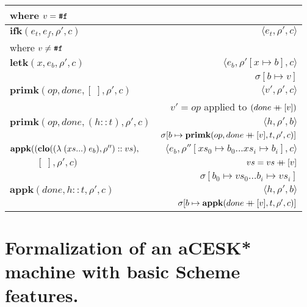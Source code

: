 \documentclass[12pt,draft]{article}
\newcommand\mdoubleplus{\ensuremath{\mathbin{+\mkern-9mu+}}}
\begin{document}
\begin{center}
\begin{tabular}{l | r}
where $v = \texttt{\#f}$ & \\
\hline
$ \textbf{ifk}(e_t , e_f , \rho' , c) $ 
& $\langle e_t , \rho' , c \rangle$ \\
where $v \not= \texttt{\#f}$ & \\
\hline
$ \textbf{letk}(x , e_b , \rho' , c) $ 
& $\langle e_b , \rho'[x \mapsto b] , c \rangle$ \\
& $ \sigma[b \mapsto v] $ \\
\hline
$ \textbf{primk}(op , done ,  [\;] , \rho' , c) $ 
& $\langle v' , \rho' , c \rangle$ \\
& $ v' = op $ applied to $(done \mdoubleplus [v])$ \\
\hline
$ \textbf{primk}(op , done ,  (h::t) , \rho' , c) $ 
& $\langle h , \rho' , b  \rangle$ \\
& $ \sigma[b \mapsto \textbf{primk}(op , done \mdoubleplus [v] , t , \rho' , c )] $ \\
\hline
$ \textbf{appk}((\textbf{clo}((\lambda\;(xs ...)\;e_b) , \rho'') :: vs), $
& $\langle e_b , \rho''[xs_0 \mapsto b_0 ... xs_i \mapsto b_i] , c \rangle$ \\
$\;\;\;\;\;\;\;\;\;\;  [\;] , \rho' , c) $
& $ vs = vs \mdoubleplus [v] $ \\
& $ \sigma[b_0 \mapsto vs_0 ... b_i \mapsto vs_i] $  \\
\hline
$ \textbf{appk}(done, h::t , \rho' , c) $
& $\langle h , \rho' , b \rangle$ \\
& $ \sigma[b \mapsto \textbf{appk}(done \mdoubleplus [v] , t , \rho' , c)] $ \\
\hline
\end{tabular}
\end{center}












\newpage



\section{Formalization of an aCESK* machine with basic Scheme features.}
\end{document}
